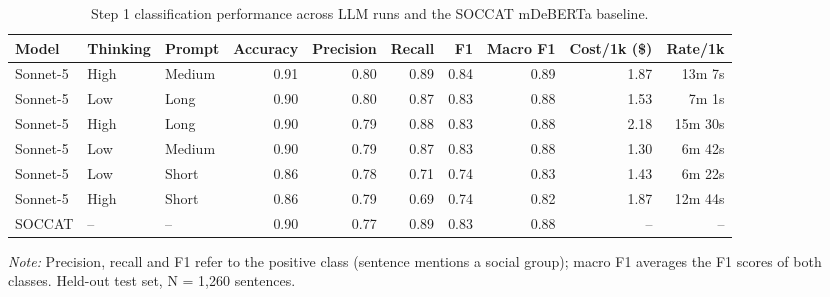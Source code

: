 \begin{table}[htb]
\centering
\begin{threeparttable}
\begin{tabular}{lllrrrrrrr}
\toprule
Model & Thinking & Prompt & Accuracy & Precision & Recall & F1 & Macro F1 & Cost/1k (\$) & Rate/1k \\
\midrule
Sonnet-5 & High & Medium & 0.91 & 0.80 & 0.89 & 0.84 & 0.89 & 1.87 & 13m 7s \\
Sonnet-5 & Low & Long & 0.90 & 0.80 & 0.87 & 0.83 & 0.88 & 1.53 & 7m 1s \\
Sonnet-5 & High & Long & 0.90 & 0.79 & 0.88 & 0.83 & 0.88 & 2.18 & 15m 30s \\
Sonnet-5 & Low & Medium & 0.90 & 0.79 & 0.87 & 0.83 & 0.88 & 1.30 & 6m 42s \\
Sonnet-5 & Low & Short & 0.86 & 0.78 & 0.71 & 0.74 & 0.83 & 1.43 & 6m 22s \\
Sonnet-5 & High & Short & 0.86 & 0.79 & 0.69 & 0.74 & 0.82 & 1.87 & 12m 44s \\
\midrule
SOCCAT & -- & -- & 0.90 & 0.77 & 0.89 & 0.83 & 0.88 & -- & -- \\
\bottomrule
\end{tabular}
\begin{tablenotes}[flushleft]
\footnotesize
\item \textit{Note:} Precision, recall and F1 refer to the positive class (sentence mentions a social group); macro F1 averages the F1 scores of both classes. Held-out test set, N = 1,260 sentences.
\end{tablenotes}
\end{threeparttable}
\caption{Step 1 classification performance across LLM runs and the SOCCAT mDeBERTa baseline.}
\label{tab:llm-step1}
\end{table}
